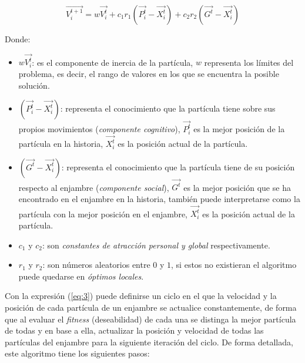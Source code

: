 \documentclass[12pt, a4paper]{article}
\begin{document}
        \begin{equation}
            \vec{V_i^{t+1}}=w\vec{V_i^t}+c_1r_1(\vec{P_i^t}-\vec{X_i^t})+c_2r_2(\vec{G^t}-\vec{X_i^t})\label{eq:3}
        \end{equation}

        Donde:

        \begin{itemize}
            \item \(w\vec{V_i^t}\): es el componente de inercia de la partícula, \(w\) representa los límites del problema, es decir, el rango de valores en los que se encuentra la posible solución.
            \item \((\vec{P_i^t}-\vec{X_i^t})\): representa el conocimiento que la partícula tiene sobre sus propios movimientos (\emph{componente cognitivo}), \(\vec{P_i^t}\) es la mejor posición de la partícula en la historia, \(\vec{X_i^t}\) es la posición actual de la partícula.
            \item \((\vec{G^t}-\vec{X_i^t})\): representa el conocimiento que la partícula tiene de su posición respecto al enjambre (\emph{componente social}), \(\vec{G^t}\) es la mejor posición que se ha encontrado en el enjambre en la historia, también puede interpretarse como la partícula con la mejor posición en el enjambre, \(\vec{X_i^t}\) es la posición actual de la partícula.
            \item \(c_1\) y \(c_2\): son \emph{constantes de atracción personal y global} respectivamente.
            \item \(r_1\) y \(r_2\): son números aleatorios entre \(0\) y \(1\), si estos no existieran el algoritmo puede quedarse en \emph{óptimos locales}.
        \end{itemize}

        Con la expresión (\ref{eq:3}) puede definirse un ciclo en el que la velocidad y la posición de cada partícula de un enjambre se actualice constantemente, de forma que al evaluar el \emph{fitness} (deseabilidad) de cada una se distinga la mejor partícula de todas y en base a ella, actualizar la posición y velocidad de todas las partículas del enjambre para la siguiente iteración del ciclo. De forma detallada, este algoritmo tiene los siguientes pasos:
    
\end{document}
